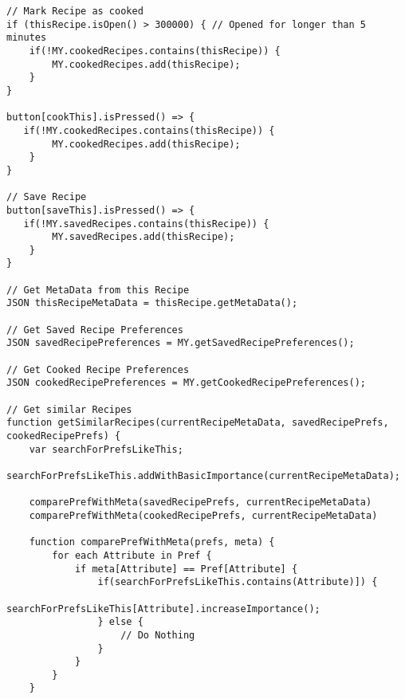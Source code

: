 \listoffigures
\newpage
	

\lstlistoflistings
\newpage
\begin{lstlisting}[caption=Pseudocode - Ähnliche Rezepte,label={lst:SimilarRecipes}]
// Mark Recipe as cooked
if (thisRecipe.isOpen() > 300000) { // Opened for longer than 5 minutes
    if(!MY.cookedRecipes.contains(thisRecipe)) { 
        MY.cookedRecipes.add(thisRecipe);
    }
}

button[cookThis].isPressed() => {
   if(!MY.cookedRecipes.contains(thisRecipe)) {
        MY.cookedRecipes.add(thisRecipe);
    }
}

// Save Recipe
button[saveThis].isPressed() => {
   if(!MY.savedRecipes.contains(thisRecipe)) {
        MY.savedRecipes.add(thisRecipe);
    }
}

// Get MetaData from this Recipe
JSON thisRecipeMetaData = thisRecipe.getMetaData();

// Get Saved Recipe Preferences
JSON savedRecipePreferences = MY.getSavedRecipePreferences();

// Get Cooked Recipe Preferences
JSON cookedRecipePreferences = MY.getCookedRecipePreferences();

// Get similar Recipes
function getSimilarRecipes(currentRecipeMetaData, savedRecipePrefs, cookedRecipePrefs) {
    var searchForPrefsLikeThis;
    searchForPrefsLikeThis.addWithBasicImportance(currentRecipeMetaData);

    comparePrefWithMeta(savedRecipePrefs, currentRecipeMetaData)
    comparePrefWithMeta(cookedRecipePrefs, currentRecipeMetaData)
    
    function comparePrefWithMeta(prefs, meta) {
        for each Attribute in Pref {
            if meta[Attribute] == Pref[Attribute] {
                if(searchForPrefsLikeThis.contains(Attribute)]) {
                    searchForPrefsLikeThis[Attribute].increaseImportance();
                } else {
                    // Do Nothing
                }
            }
        }
    }


\end{lstlisting}
